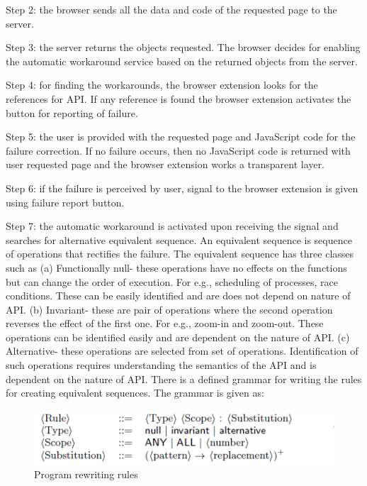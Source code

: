 \begin{compactitem}
Step 2: the browser sends all the data and code of the requested page to the server.

Step 3: the server returns the objects requested. The browser decides for enabling the automatic 
workaround service based on the returned objects from the server.

Step 4: for finding the workarounds, the browser extension looks for the references for API. If any 
reference is found the browser extension activates the button for reporting of failure.

Step 5: the user is provided with the requested page and JavaScript code for the failure correction. If no failure occurs, then no JavaScript code is returned with user requested page and the browser extension works a transparent layer.

Step 6: if the failure is perceived by user, signal to the browser extension is given using failure report button.

Step 7: the automatic workaround is activated upon receiving the signal and searches for alternative 
equivalent sequence. An equivalent sequence is sequence of operations that rectifies the failure. The equivalent sequence has three classes such as 
(a) Functionally null- these operations have no effects on the functions but can change the 
order of execution. For e.g., scheduling of processes, race conditions. These can be easily 
identified and are does not depend on nature of API. (b) Invariant- these are pair of operations where the second operation reverses the effect of the first one. For e.g., zoom-in and zoom-out. These operations can be identified easily 
and are dependent on the nature of API.
(c) Alternative- these operations are selected from set of operations. Identification of such operations requires understanding the semantics of the API and is dependent on the nature of API. There is a defined grammar for writing the rules for creating equivalent sequences. The grammar is 
given as:
\begin{figure}[H]
\center
\includegraphics[width=5in]{img/programrewriting}
\caption{Program rewriting rules}
\end{figure}



\end{compactitem}
